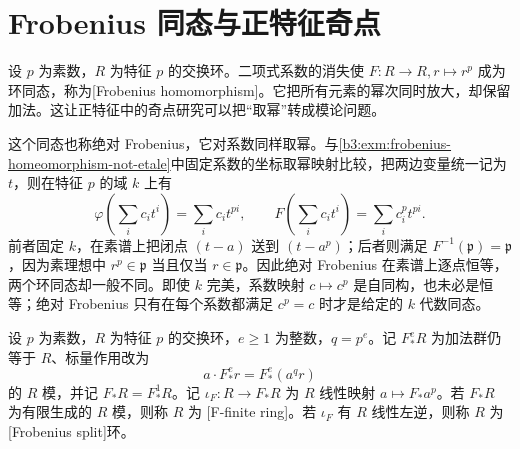 
\section{Frobenius 同态与正特征奇点}
\label{b3:sec:C02}

%
%
%



设 \(p\) 为素数，\(R\) 为特征 \(p\) 的交换环。二项式系数的消失使 \(F:R\to R,r\mapsto r^p\) 成为环同态，称为[Frobenius homomorphism]。它把所有元素的幂次同时放大，却保留加法。这让正特征中的奇点研究可以把“取幂”转成模论问题。

\ProseParagraphBreak
这个同态也称绝对 Frobenius，它对系数同样取幂。与\cref{b3:exm:frobenius-homeomorphism-not-etale}中固定系数的坐标取幂映射比较，把两边变量统一记为 \(t\)，则在特征 \(p\) 的域 \(k\) 上有
\[
	\varphi\left(\sum_i c_it^i\right)=\sum_i c_it^{pi}, \qquad F\left(\sum_i c_it^i\right)=\sum_i c_i^pt^{pi}.
\]
前者固定 \(k\)，在素谱上把闭点 \((t-a)\) 送到 \((t-a^p)\)；后者则满足 \(F^{-1}(\mathfrak p)=\mathfrak p\)，因为素理想中 \(r^p\in\mathfrak p\) 当且仅当 \(r\in\mathfrak p\)。因此绝对 Frobenius 在素谱上逐点恒等，两个环同态却一般不同。即使 \(k\) 完美，系数映射 \(c\mapsto c^p\) 是自同构，也未必是恒等；绝对 Frobenius 只有在每个系数都满足 \(c^p=c\) 时才是给定的 \(k\) 代数同态。

\begin{definition}\label{b3:def:frobenius-pushforward}
	设 \(p\) 为素数，\(R\) 为特征 \(p\) 的交换环，\(e\ge1\) 为整数，\(q=p^e\)。记 \(F_*^eR\) 为加法群仍等于 \(R\)、标量作用改为
	\[
		a\cdot F_*^e r=F_*^e(a^q r)
	\]
	的 \(R\) 模，并记 \(F_*R=F_*^1R\)。记 \(\iota_F:R\to F_*R\) 为 \(R\) 线性映射 \(a\mapsto F_*a^p\)。若 \(F_*R\) 为有限生成的 \(R\) 模，则称 \(R\) 为 [F-finite ring]。若 \(\iota_F\) 有 \(R\) 线性左逆，则称 \(R\) 为[Frobenius split]环。
\end{definition}

